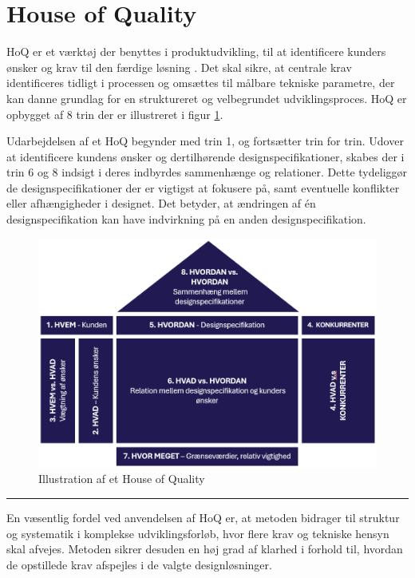 \section{House of Quality} \label{House of Quality}
HoQ er et værktøj der benyttes i produktudvikling, til at identificere kunders ønsker og krav til den færdige løsning \parencite{Ullman2018TheProcess}. Det skal sikre, at centrale krav identificeres tidligt i processen og omsættes til målbare tekniske parametre, der kan danne grundlag for en struktureret og velbegrundet udviklingsproces. HoQ er opbygget af 8 trin der er illustreret i figur \ref{fig: HOQ illustration}.  

Udarbejdelsen af et HoQ begynder med trin 1, og fortsætter trin for trin. Udover at identificere kundens ønsker og dertilhørende designspecifikationer, skabes der i trin 6 og 8 indsigt i deres indbyrdes sammenhænge og relationer. Dette tydeliggør de designspecifikationer der er vigtigst at fokusere på, samt eventuelle konflikter eller afhængigheder i designet. Det betyder, at ændringen af én designspecifikation kan have indvirkning på en anden designspecifikation. 

\begin{figure}[H]
    \centering
    \includegraphics[width=1\linewidth]{Sections/4 Kravspecifikation/Media/HOQ1.png}
    \caption{Illustration af et House of Quality}
    \label{fig: HOQ illustration}
\end{figure} \plainbreak{-0.5}

En væsentlig fordel ved anvendelsen af HoQ er, at metoden bidrager til struktur og systematik i komplekse udviklingsforløb, hvor flere krav og tekniske hensyn skal afvejes. Metoden sikrer desuden en høj grad af klarhed i forhold til, hvordan de opstillede krav afspejles i de valgte designløsninger.



